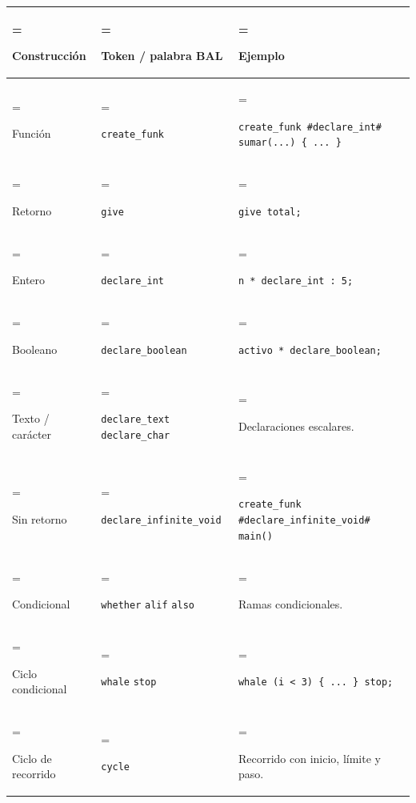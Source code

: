 \begin{xltabular}{\textwidth}{
    @{}
    >{\hsize\linewidth=\hsize\raggedright\arraybackslash}X
    >{\hsize\linewidth=\hsize\raggedright\arraybackslash}X
    >{\hsize\linewidth=\hsize\raggedright\arraybackslash}X
    @{}
}
\toprule
Construcción & Token / palabra BAL & Ejemplo \\
\midrule
\endhead

\bottomrule
\endlastfoot

Función &
\texttt{create\_funk} &
\texttt{create\_funk \#declare\_int\# sumar(...) \{ ... \}} \\

\addlinespace

Retorno &
\texttt{give} &
\texttt{give total;} \\

\addlinespace

Entero &
\texttt{declare\_int} &
\texttt{n * declare\_int : 5;} \\

\addlinespace

Booleano &
\texttt{declare\_boolean} &
\texttt{activo * declare\_boolean;} \\

\addlinespace

Texto / carácter &
\texttt{declare\_text}\newline
\texttt{declare\_char} &
Declaraciones escalares. \\

\addlinespace

Sin retorno &
\texttt{declare\_infinite\_void} &
\texttt{create\_funk \#declare\_infinite\_void\# main()} \\

\addlinespace

Condicional &
\texttt{whether}\newline
\texttt{alif}\newline
\texttt{also} &
Ramas condicionales. \\

\addlinespace

Ciclo condicional &
\texttt{whale}\newline
\texttt{stop} &
\texttt{whale (i \textless{} 3) \{ ... \} stop;} \\

\addlinespace

Ciclo de recorrido &
\texttt{cycle} &
Recorrido con inicio, límite y paso. \\


\end{xltabular}
